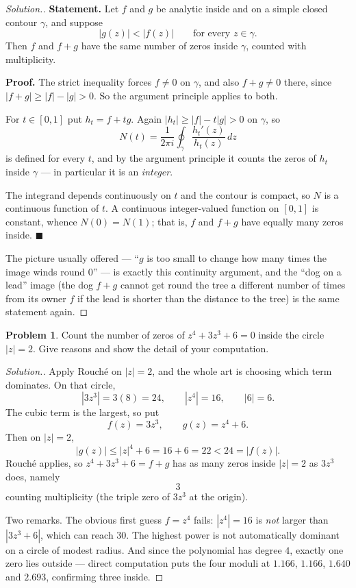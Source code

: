 \documentclass[11pt,a4paper]{article}
\theoremstyle{definition}
\newtheorem{problemx}{Problem}[section]
\newenvironment{problem}{\begin{problemx}}{\end{problemx}}
\newenvironment{solution}
  {\renewcommand{\qedsymbol}{}\begin{proof}[\textit{Solution}.]}
  {\end{proof}}
\begin{document}
\begin{solution}
\textbf{Statement.} Let $f$ and $g$ be analytic inside and on a simple closed
contour $\gamma$, and suppose
$$\left|g(z)\right| < \left|f(z)\right| \qquad\text{for every } z \in \gamma .$$
Then $f$ and $f+g$ have the same number of zeros inside $\gamma$, counted with
multiplicity.

\textbf{Proof.} The strict inequality forces $f \neq 0$ on $\gamma$, and also
$f + g \neq 0$ there, since $\left|f+g\right| \geq \left|f\right|-\left|g\right| > 0$.
So the argument principle applies to both.

For $t \in [0,1]$ put $h_t = f + tg$. Again
$\left|h_t\right| \geq \left|f\right| - t\left|g\right| > 0$ on $\gamma$, so
$$N(t) = \frac{1}{2\pi i}\oint_{\gamma}\frac{h_t'(z)}{h_t(z)}\,dz$$
is defined for every $t$, and by the argument principle it counts the zeros of
$h_t$ inside $\gamma$ --- in particular it is an \emph{integer}.

The integrand depends continuously on $t$ and the contour is compact, so $N$ is a
continuous function of $t$. A continuous integer-valued function on $[0,1]$ is
constant, whence $N(0) = N(1)$; that is, $f$ and $f+g$ have equally many zeros
inside. $\blacksquare$

The picture usually offered --- ``$g$ is too small to change how many times the
image winds round $0$'' --- is exactly this continuity argument, and the ``dog on a
lead'' image (the dog $f+g$ cannot get round the tree a different number of times
from its owner $f$ if the lead is shorter than the distance to the tree) is the
same statement again.
\end{solution}


\begin{problem}
Count the number of zeros of $z^{4} + 3z^{3} + 6 = 0$ inside the circle
$\left|z\right| = 2$. Give reasons and show the detail of your computation.
\end{problem}

\begin{solution}
Apply Rouch\'e on $\left|z\right| = 2$, and the whole art is choosing which term
dominates. On that circle,
$$\left|3z^{3}\right| = 3(8) = 24,\qquad
\left|z^{4}\right| = 16,\qquad \left|6\right| = 6 .$$
The cubic term is the largest, so put
$$f(z) = 3z^{3},\qquad g(z) = z^{4} + 6 .$$
Then on $\left|z\right| = 2$,
$$\left|g(z)\right| \leq \left|z\right|^{4} + 6 = 16 + 6 = 22 < 24 = \left|f(z)\right| .$$
Rouch\'e applies, so $z^{4}+3z^{3}+6 = f+g$ has as many zeros inside
$\left|z\right| = 2$ as $3z^{3}$ does, namely
$$\boxed{3}$$
counting multiplicity (the triple zero of $3z^{3}$ at the origin).

Two remarks. The obvious first guess $f = z^{4}$ fails: $\left|z^4\right| = 16$ is
\emph{not} larger than $\left|3z^{3}+6\right|$, which can reach $30$. The highest
power is not automatically dominant on a circle of modest radius. And since the
polynomial has degree $4$, exactly one zero lies outside --- direct computation puts
the four moduli at $1.166$, $1.166$, $1.640$ and $2.693$, confirming three inside.
\end{solution}
\end{document}
